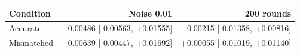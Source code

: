 \begin{tabular}{lrr}
\toprule
Condition & Noise 0.01 & 200 rounds \\
\midrule
Accurate & +0.00486 [-0.00563, +0.01555] & -0.00215 [-0.01358, +0.00816] \\
Mismatched & +0.00639 [-0.00447, +0.01692] & +0.00055 [-0.01019, +0.01140] \\
\bottomrule
\end{tabular}
